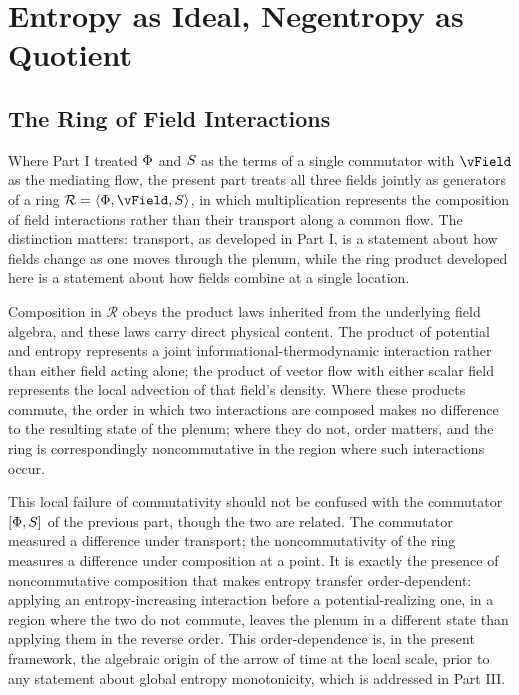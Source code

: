 \part{Entropy as Ideal, Negentropy as Quotient}

\chapter{The Ring of Field Interactions}

Where Part I treated $\Phi$ and $S$ as the terms of a single commutator with $\vField$ as the mediating flow, the present part treats all three fields jointly as generators of a ring $\mathcal{R} = \langle \PhiField, \vField, \SEntropy \rangle$, in which multiplication represents the composition of field interactions rather than their transport along a common flow. The distinction matters: transport, as developed in Part I, is a statement about how fields change as one moves through the plenum, while the ring product developed here is a statement about how fields combine at a single location.

Composition in $\mathcal{R}$ obeys the product laws inherited from the underlying field algebra, and these laws carry direct physical content. The product of potential and entropy represents a joint informational-thermodynamic interaction rather than either field acting alone; the product of vector flow with either scalar field represents the local advection of that field's density. Where these products commute, the order in which two interactions are composed makes no difference to the resulting state of the plenum; where they do not, order matters, and the ring is correspondingly noncommutative in the region where such interactions occur.

This local failure of commutativity should not be confused with the commutator $[\Phi, S]$ of the previous part, though the two are related. The commutator measured a difference under transport; the noncommutativity of the ring measures a difference under composition at a point. It is exactly the presence of noncommutative composition that makes entropy transfer order-dependent: applying an entropy-increasing interaction before a potential-realizing one, in a region where the two do not commute, leaves the plenum in a different state than applying them in the reverse order. This order-dependence is, in the present framework, the algebraic origin of the arrow of time at the local scale, prior to any statement about global entropy monotonicity, which is addressed in Part III.

